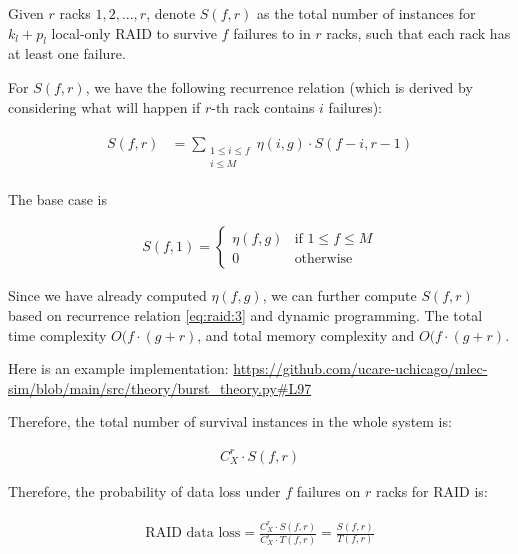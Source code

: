 \documentclass{article}
\begin{document}
Given $r$ racks $1,2,...,r$, denote $S(f,r)$ as the total number of instances for $k_l+p_l$ local-only RAID to survive $f$ failures to in $r$ racks, such that each rack has at least one failure.

For $S(f,r)$, we have the following recurrence relation (which is derived by considering what will happen if $r$-th rack contains $i$ failures):

\begin{eqnarray}
\begin{aligned}
  S(f,r)
  &= \sum_{\substack{1 \leq i \leq f \\ i \leq M}} \eta(i,g) \cdot S(f-i, r-1)
\end{aligned}
\label{eq:raid:3}
\end{eqnarray}

The base case is 

\begin{eqnarray}
  S(f,1) =
    \begin{cases}
      \eta(f,g)& \text{if $1 \leq f \leq M$}\\
      0 & \text{otherwise}
    \end{cases}       
\label{eq:raid:4}
\end{eqnarray}

Since we have already computed $\eta(f,g)$, we can further compute $S(f,r)$ based on recurrence relation \ref{eq:raid:3} and dynamic programming. The total time complexity $O(f \cdot (g+r)$, and total memory complexity and $O(f \cdot (g+r)$.

Here is an example implementation: \url{https://github.com/ucare-uchicago/mlec-sim/blob/main/src/theory/burst_theory.py#L97}

Therefore, the total number of survival instances in the whole system is:

\begin{eqnarray}
C_{X}^{r} \cdot S(f,r)
\label{eq:raid:5}
\end{eqnarray}

Therefore, the probability of data loss under $f$ failures on $r$ racks for RAID is:

\begin{eqnarray}
\begin{aligned}
\text{RAID data loss} = \frac{C_{X}^{r} \cdot S(f,r)} 
{C_{X}^{r} \cdot T(f,r)}
= \frac{ S(f,r)} { T(f,r)}
\end{aligned}
\label{eq:raid:6}
\end{eqnarray}
\end{document}
